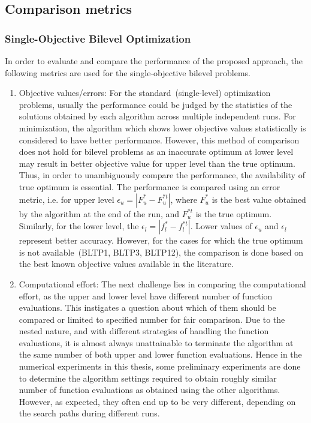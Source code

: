 \subsection{Comparison metrics}
\subsubsection{Single-Objective Bilevel Optimization}
\label{sing_mat}
In order to evaluate and compare the performance of the proposed approach, the following metrics are used for the single-objective bilevel problems. 

\begin{enumerate}
\item Objective values/errors: For the standard~(single-level) optimization problems, usually the performance could be judged by the statistics of the solutions obtained by each algorithm across multiple independent runs. For minimization, the algorithm which shows lower objective values statistically is considered to have better performance. However, this method of comparison does not hold for bilevel problems as an inaccurate optimum at lower level may result in better objective value for upper level than the true optimum. Thus, in order to unambiguously compare the performance, the availability of true optimum is essential. The performance is compared using an error metric, i.e. for upper level $\epsilon_u = |F^*_u-F^{*t}_u|$, where $F_u^*$ is the best value obtained by the algorithm at the end of the run, and $F^{*t}_u$ is the true optimum. Similarly, for the lower level, the $\epsilon_l = |f^*_l-f^{*t}_l|$. Lower values of $\epsilon_u$ and $\epsilon_l$ represent better accuracy. However, for the cases for which the true optimum is not available~(BLTP1, BLTP3, BLTP12), the comparison is done based on the best known objective values available in the literature. 

\item Computational effort: The next challenge lies in comparing the computational effort, as the upper and lower level have different number of function evaluations. This instigates a question about which of them should be compared or limited to specified number for fair comparison. Due to the nested nature, and with different strategies of handling the function evaluations, it is almost always unattainable to terminate the algorithm at the same number of both upper and lower function evaluations. Hence in the numerical experiments in this thesis, some preliminary experiments are done to determine the algorithm settings required to obtain roughly similar number of function evaluations as obtained using the other algorithms. However, as expected, they often end up to be very different, depending on the search paths during different runs. 


\end{enumerate}
